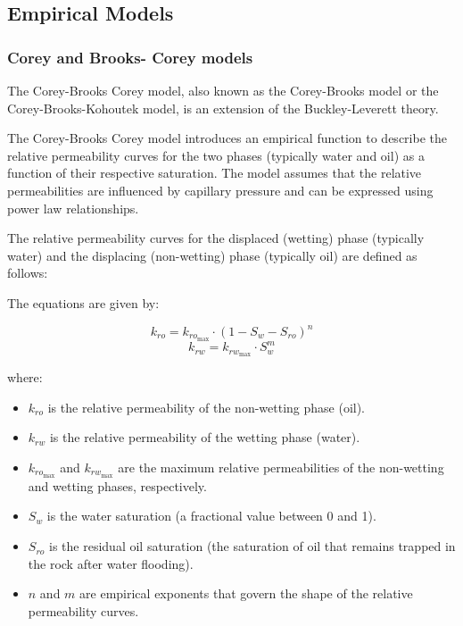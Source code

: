 {\subsection{Empirical Models}
	\subsubsection{Corey and Brooks- Corey models}
		The Corey-Brooks Corey model, also known as the Corey-Brooks model or the Corey-Brooks-Kohoutek model, is an extension of the Buckley-Leverett theory.
	
		The Corey-Brooks Corey model introduces an empirical function to describe the relative permeability curves for the two phases (typically water and oil) as a function of their respective saturation. The model assumes that the relative permeabilities are influenced by capillary pressure and can be expressed using power law relationships.
		
		The relative permeability curves for the displaced (wetting) phase (typically water) and the displacing (non-wetting) phase (typically oil) are defined as follows:

		The equations are given by:

		\[ k_{ro} = k_{ro_{\text{max}}} \cdot (1 - S_w - S_{ro})^n \]
		\[ k_{rw} = k_{rw_{\text{max}}} \cdot S_w^m \]
		 
		where:
		\begin{itemize}
			\item  \( k_{ro} \) is the relative permeability of the non-wetting phase (oil).
			
			\item\( k_{rw} \) is the relative permeability of the wetting phase (water).
			
			\item \( k_{ro_{\text{max}}} \) and \( k_{rw_{\text{max}}} \) are the maximum relative permeabilities of the non-wetting and wetting phases, respectively.
			
			\item \( S_w \) is the water saturation (a fractional value between 0 and 1).
			
			\item \( S_{ro} \) is the residual oil saturation (the saturation of oil that remains trapped in the rock after water flooding).
			
			\item \( n \) and \( m \) are empirical exponents that govern the shape of the relative permeability curves.
			

\end{itemize}}
